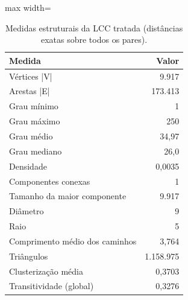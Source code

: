 \begin{table}[!htb]
\centering
\caption{Medidas estruturais da LCC tratada (distâncias exatas sobre todos os pares).}
\label{tab:parte1}
\begin{adjustbox}{max width=\linewidth}
\begin{tabular}{lr}
\toprule
Medida & Valor \\
\midrule
Vértices |V| & 9.917 \\
Arestas |E| & 173.413 \\
Grau mínimo & 1 \\
Grau máximo & 250 \\
Grau médio & 34,97 \\
Grau mediano & 26,0 \\
Densidade & 0,0035 \\
Componentes conexas & 1 \\
Tamanho da maior componente & 9.917 \\
Diâmetro & 9 \\
Raio & 5 \\
Comprimento médio dos caminhos & 3,764 \\
Triângulos & 1.158.975 \\
Clusterização média & 0,3703 \\
Transitividade (global) & 0,3276 \\
\bottomrule
\end{tabular}
\end{adjustbox}
\end{table}
